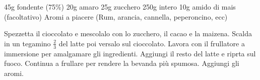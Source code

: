 \begin{ingreds}
	45g  fondente (75\%)
	20g  amaro
	25g zucchero
	250g  intero
	10g amido di mais (facoltativo)
	Aromi a piacere (Rum, arancia, cannella, peperoncino, ecc)

\end{ingreds}

\begin{method}
Spezzetta il cioccolato e mescolalo con lo zucchero, il cacao e la maizena. Scalda in un tegamino $\frac{2}{3}$ del latte poi versalo sul cioccolato. Lavora con il frullatore a immersione per amalgamare gli ingredienti. Aggiungi il resto del latte e riprta sul fuoco. Continua a frullare per rendere la bevanda più spumosa. Aggiungi gli aromi.
\end{method}



